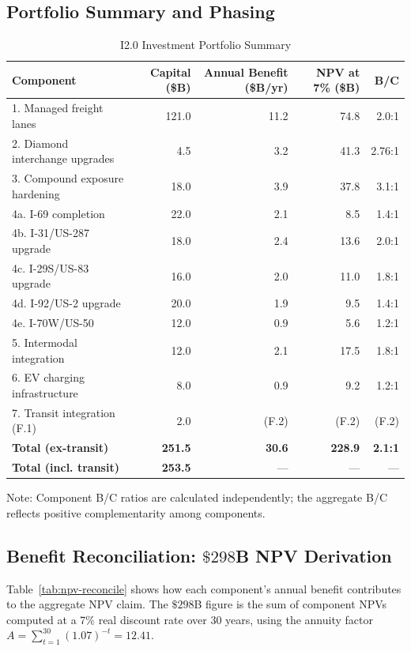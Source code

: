 \subsection{Portfolio Summary and Phasing}

\begin{table}[h]
\centering
\caption{I2.0 Investment Portfolio Summary}
\label{tab:portfolio}
\begin{tabular}{lrrrr}
\toprule
Component & Capital (\$B) & Annual Benefit (\$B/yr) & NPV at 7\% (\$B) & B/C \\
\midrule
1. Managed freight lanes & 121.0 & 11.2 & 74.8 & 2.0:1 \\
2. Diamond interchange upgrades & 4.5 & 3.2 & 41.3 & 2.76:1 \\
3. Compound exposure hardening & 18.0 & 3.9 & 37.8 & 3.1:1 \\
4a. I-69 completion & 22.0 & 2.1 & 8.5 & 1.4:1 \\
4b. I-31/US-287 upgrade & 18.0 & 2.4 & 13.6 & 2.0:1 \\
4c. I-29S/US-83 upgrade & 16.0 & 2.0 & 11.0 & 1.8:1 \\
4d. I-92/US-2 upgrade & 20.0 & 1.9 & 9.5 & 1.4:1 \\
4e. I-70W/US-50 & 12.0 & 0.9 & 5.6 & 1.2:1 \\
5. Intermodal integration & 12.0 & 2.1 & 17.5 & 1.8:1 \\
6. EV charging infrastructure & 8.0 & 0.9 & 9.2 & 1.2:1 \\
7. Transit integration (F.1) & 2.0 & (F.2) & (F.2) & (F.2) \\
\midrule
\textbf{Total (ex-transit)} & \textbf{251.5} & \textbf{30.6} & \textbf{228.9} & \textbf{2.1:1} \\
\textbf{Total (incl. transit)} & \textbf{253.5} & --- & --- & --- \\
\bottomrule
\end{tabular}
\end{table}

\noindent Note: Component B/C ratios are calculated independently; the aggregate B/C reflects positive complementarity among components.

\subsection{Benefit Reconciliation: $\$298$B NPV Derivation}
\label{sec:npv-reconcile}

Table~\ref{tab:npv-reconcile} shows how each component's annual benefit contributes to the
aggregate NPV claim. The $\$298$B figure is the sum of component NPVs computed at a 7\%
real discount rate over 30 years, using the annuity factor $A = \sum_{t=1}^{30}(1.07)^{-t}
= 12.41$.

